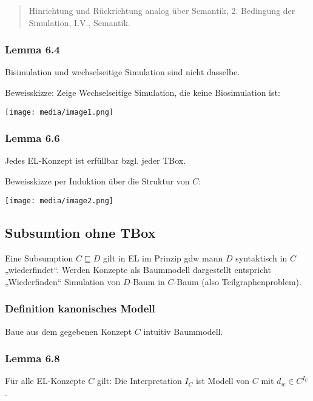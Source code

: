 \begin{quote}
Hinrichtung und Rückrichtung analog über Semantik, 2. Bedingung der
Simulation, I.V., Semantik.
\end{quote}

\subsubsection{Lemma 6.4}\label{lemma-6.4}

Bisimulation und wechselseitige Simulation sind nicht dasselbe.

Beweisskizze: Zeige Wechselseitige Simulation, die keine Biosimulation
ist:

\texttt{[image: media/image1.png]}

\subsubsection{Lemma 6.6}\label{lemma-6.6}

Jedes EL-Konzept ist erfüllbar bzgl. jeder TBox.

Beweisskizze per Induktion über die Struktur von $C$:

\texttt{[image: media/image2.png]}

\subsection{Subsumtion ohne TBox}\label{subsumtion-ohne-tbox}

Eine Subsumption $C \sqsubseteq D$ gilt in EL im Prinzip gdw mann
$D$ syntaktisch in $C$ „wiederfindet``. Werden Konzepte als
Baummodell dargestellt entspricht „Wiederfinden`` Simulation von
$D$-Baum in $C$-Baum (also Teilgraphenproblem).

\subsubsection{Definition kanonisches
Modell}\label{definition-kanonisches-modell}

Baue aus dem gegebenen Konzept $C$ intuitiv Baummodell.

\hypertarget{lemma-6.8}{\subsubsection{Lemma 6.8}\label{lemma-6.8}}

Für alle EL-Konzepte $C$ gilt: Die Interpretation $I_{C}$ ist Modell
von $C$ mit $d_{w} \in C^{I_{C}}$.

